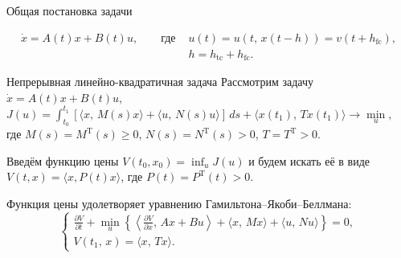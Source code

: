         \maketitle
        \begin{frame}[t]{Общая постановка задачи}
                \centering
                
                \vspace{0.5cm}
                \begin{equation*}
                        \begin{aligned}
                                \dot x = A(t)x + B(t)u, \qquad\mbox{где }
                                &u(t) = u(t,\,x(t - h)) = v(t + h_{\mathrm{fc}}),\\
                                &h = h_{\mathrm{tc}} + h_{\mathrm{fc}}.
                        \end{aligned}
                \end{equation*}
        \end{frame}
       \begin{frame}{Непрерывная линейно-квадратичная задача}
                Рассмотрим задачу
                $
                        \dot x = A(t)x+B(t)u,
                $
                $
                        J(u)
                =
                        \int_{t_0}^{t_1}
                [
                \langle
                x,\,M(s)x
                \rangle
                +
                \langle
                u,\,N(s)u
                \rangle
                ]\,ds
                        +
                        \langle
                        x(t_1),\,Tx(t_1)
                        \rangle
                \to
                        \min\limits_{u},
                $
где $M(s) = M^{\mathrm{T}}(s) \geqslant 0$,
$N(s) = N^{\mathrm{T}}(s) > 0$,
$T = T^{\mathrm{T}} > 0$.
                \vspace{1cm}

                Введём функцию цены
                $
                        V(t_0, x_0) = \inf_{u}{J(u)}
                $ и будем искать её в виде $V(t,x) = \langle x, P(t) x\rangle$, где $P(t) = P^{\mathrm{T}}(t) > 0.$

                \vspace{1cm}

                Функция цены удолетворяет уравнению Гамильтона--Якоби--Беллмана:
                \begin{equation*}
\begin{cases}
        \frac{\partial V}{\partial t}
        +
        \min\limits_{u}
        \left\{
        
\left\langle
\frac{\partial V}{\partial x}
,\,
Ax + Bu
\right\rangle
+
\langle
x,\,Mx
\rangle
+
\langle
u,\,Nu
\rangle
        
        \right\}
        =
        0,
\\
        V(t_1,\,x)
        =
        \langle x,\,Tx \rangle.
\end{cases}
\end{equation*}
        \end{frame}
